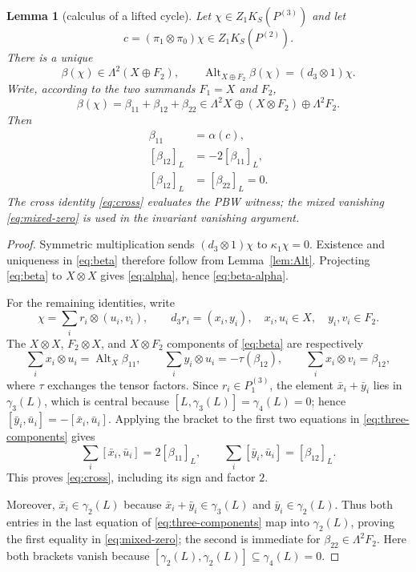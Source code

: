 \documentclass[11pt]{amsart}
\newtheorem{lemma}[theorem]{Lemma}
\newcommand{\gm}{\gamma}
\newcommand{\Alt}{\operatorname{Alt}}
\begin{document}
\begin{lemma}[calculus of a lifted cycle]\label{lem:lifted-cycle}
Let $\chi\in Z_1K_S(P^{(3)})$ and let
\[
 c=(\pi_1\otimes\pi_0)\chi\in Z_1K_S(P^{(2)}).
\]
There is a unique
\begin{equation}\label{eq:beta}
 \beta(\chi)\in\Lambda^2(X\oplus F_2),
 \qquad
 \Alt_{X\oplus F_2}\beta(\chi)=(d_3\otimes1)\chi.
\end{equation}
Write, according to the two summands $F_1=X$ and $F_2$,
\begin{equation}\label{eq:beta-split}
 \beta(\chi)=\beta_{11}+\beta_{12}+\beta_{22}
 \in\Lambda^2X\oplus(X\otimes F_2)\oplus\Lambda^2F_2.
\end{equation}
Then
\begin{align}
 \beta_{11}&=\alpha(c),                                      \label{eq:beta-alpha}\\
 [\beta_{12}]_L&=-2[\beta_{11}]_L,                           \label{eq:cross}\\
 [\beta_{12}]_L&=[\beta_{22}]_L=0.                          \label{eq:mixed-zero}
\end{align}
The cross identity \eqref{eq:cross} evaluates the PBW witness; the
mixed vanishing \eqref{eq:mixed-zero} is used in the invariant
vanishing argument.
\end{lemma}

\begin{proof}
Symmetric multiplication sends $(d_3\otimes1)\chi$ to
$\kappa_1\chi=0$.  Existence and uniqueness in \eqref{eq:beta}
therefore follow from Lemma~\ref{lem:Alt}.  Projecting
\eqref{eq:beta} to $X\otimes X$ gives \eqref{eq:alpha}, hence
\eqref{eq:beta-alpha}.

For the remaining identities, write
\[
 \chi=\sum_i r_i\otimes(u_i,v_i),
 \qquad d_3r_i=(x_i,y_i),
 \quad x_i,u_i\in X,\quad y_i,v_i\in F_2.
\]
The $X\otimes X$, $F_2\otimes X$, and $X\otimes F_2$ components of
\eqref{eq:beta} are respectively
\begin{equation}\label{eq:three-components}
 \sum_i x_i\otimes u_i=\Alt_X\beta_{11},
 \qquad
 \sum_i y_i\otimes u_i=-\tau(\beta_{12}),
 \qquad
 \sum_i x_i\otimes v_i=\beta_{12},
\end{equation}
where $\tau$ exchanges the tensor factors.  Since $r_i\in P^{(3)}_1$,
the element $\bar x_i+\bar y_i$ lies in $\gm_3(L)$, which is central
because $[L,\gm_3(L)]=\gm_4(L)=0$; hence
$[\bar y_i,\bar u_i]=-[\bar x_i,\bar u_i]$.  Applying the bracket
to the first two equations in \eqref{eq:three-components} gives
\[
 \sum_i[\bar x_i,\bar u_i]=2[\beta_{11}]_L,
 \qquad
 \sum_i[\bar y_i,\bar u_i]=[\beta_{12}]_L.
\]
This proves \eqref{eq:cross}, including its sign and factor $2$.

Moreover, $\bar x_i\in\gm_2(L)$ because
$\bar x_i+\bar y_i\in\gm_3(L)$ and $\bar y_i\in\gm_2(L)$.
Thus both entries in the last equation of
\eqref{eq:three-components} map into $\gm_2(L)$, proving the first
equality in \eqref{eq:mixed-zero}; the second is immediate for
$\beta_{22}\in\Lambda^2F_2$.  Here both brackets vanish because
$[\gm_2(L),\gm_2(L)]\subseteq\gm_4(L)=0$.
\end{proof}
\end{document}
